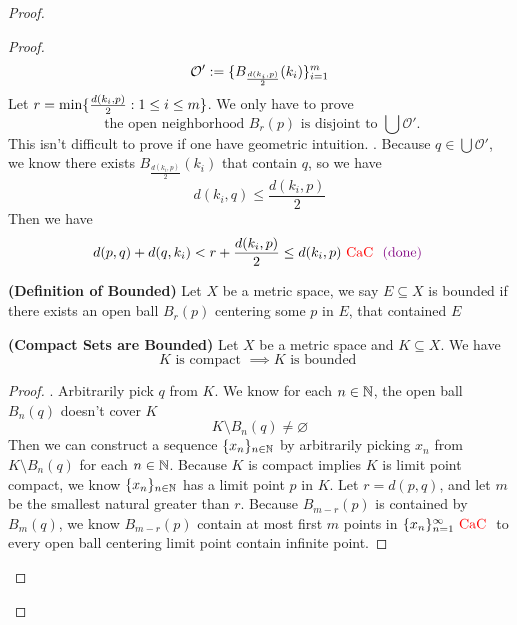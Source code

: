 \documentclass{report}
\begin{document}
\begin{proof}
\begin{proof}
\begin{equation}
\mathcal{O}':=\{ B_{\frac{d(k_i,p)}{2}}(k_i) \}_{i=1}^m
\end{equation}
Let $r=\min \{ \frac{d(k_i,p)}{2}:1\leq i\leq m \}$. We only have to prove 
\begin{equation}
  \text{ the open neighborhood $B_r(p)$ is disjoint to $\bigcup \mathcal{O}'$.}
\end{equation}
This isn't difficult to prove if one have geometric intuition.  . Because $q\in \bigcup \mathcal{O}'$, we know there exists $B_{\frac{d(k_i,p)}{2}}(k_i)$ that contain $q$, so we have
 \begin{equation}
d(k_i,q)\leq \frac{d(k_i,p)}{2}
\end{equation}
Then we have
\begin{equation}
d(p,q)+d(q,k_i)< r+\frac{d(k_i,p)}{2}\leq d(k_i,p)\text{ \textcolor{red}{CaC} }\textcolor{violet}{\text{ (done) }}
\end{equation}
\begin{definition}
\label{1.11.4}
\textbf{(Definition of Bounded)} Let $X$ be a metric space, we say $E\subseteq X$ is bounded if there exists an open ball $B_r(p)$ centering some $p$ in $E$, that contained $E$
\end{definition}
\begin{theorem}
\label{1.11.5}
\textbf{(Compact Sets are Bounded)} Let $X$ be a metric space and $K\subseteq X$. We have
\begin{equation}
K\text{ is compact }\implies K\text{ is bounded }
\end{equation}
\end{theorem}
\begin{proof}
. Arbitrarily pick $q$ from  $K$. We know for each $n\in\mathbb{N}$, the open ball $B_n(q)$ doesn't cover $K$  
\begin{equation}
K\setminus B_n(q)\neq \varnothing
\end{equation}
Then we can construct a sequence $\{ x_n \}_{n\in\mathbb{N}}$ by arbitrarily picking $x_n$ from $K\setminus B_n(q)$ for each $n\in\mathbb{N}$. Because  $K$ is compact implies $K$ is limit point compact, we know $\{ x_n \}_{n\in\mathbb{N}}$ has a limit point  $p$ in  $K$. Let $r=d(p,q)$, and let $m$ be the smallest natural greater than  $r$. Because $B_{m-r}(p)$ is contained by $B_m(q)$, we know $B_{m-r}(p)$ contain at most first $m$ points in  $\{ x_n \}_{n=1}^\infty\text{ \textcolor{red}{CaC} }$ to every open ball centering limit point contain infinite point.
\end{proof}
\begin{corollary}

\end{corollary}
\end{proof}
\end{proof}
\end{document}
